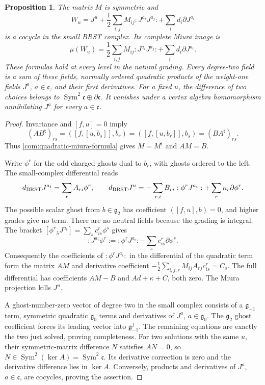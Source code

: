 \documentclass[11pt,a4paper]{amsart}
\numberwithin{equation}{section}
\newtheorem{proposition}[theorem]{Proposition}
\theoremstyle{definition}
\theoremstyle{remark}
\newcommand{\g}{\mathfrak g}
\newcommand{\Sym}{\operatorname{Sym}}
\begin{document}
\begin{proposition}\label{com:quadratic-miura}
The matrix $M$ is symmetric and
$$
 W_u=J^u+\frac12\sum_{i,j}M_{ij}:J^{a_i}J^{a_j}:
          +\sum_i d_i\partial J^{a_i}
$$
is a cocycle in the small BRST complex. Its complete Miura image is
$$
 \mu(W_u)=\frac12\sum_{i,j}M_{ij}:J^{a_i}J^{a_j}:
          +\sum_i d_i\partial J^{a_i}.
$$
These formulas hold at every level in the natural grading. Every
degree-two field is a sum of these fields, normally ordered quadratic
products of the weight-one fields $J^a$, $a\in\mathfrak c$, and their
first derivatives. For a fixed $u$, the difference of two choices belongs to $\Sym^2\mathfrak c\oplus\partial\mathfrak c$.
It vanishes under a vertex algebra homomorphism annihilating
$J^a$ for every $a\in\mathfrak c$.
\end{proposition}
\begin{proof}
Invariance and $[f,u]=0$ imply
$$
 (AB^{\mathsf t})_{rs}=([f,[u,b_s]],b_r)
 =([f,[u,b_r]],b_s)=(BA^{\mathsf t})_{rs}.
$$
Thus \eqref{com:quadratic-miura-formula} gives $M=M^{\mathsf t}$
and $AM=B$.

Write $\phi^r$ for the odd charged ghosts dual to $b_r$, with ghosts
ordered to the left. The small-complex differential
\cite[equation~(2.6)]{KacWakimoto2004} reads
$$
 d_{\rm BRST}J^{a_i}=\sum_r A_{ri}\phi^r,
 \qquad
 d_{\rm BRST}J^u=-\sum_{r,i}B_{ri}:\phi^rJ^{a_i}:
                         +\sum_r\kappa_r\partial\phi^r.
$$
The possible scalar ghost from $b\in\g_2$ has coefficient
$([f,u],b)=0$, and higher grades give no term. There are no neutral fields because the grading is integral. The bracket
$[\phi^r{}_{\lambda}J^{a_i}]=\sum_s c_{is}^{r}\phi^s$
gives
$$
 :J^{a_i}\phi^r:=:\phi^rJ^{a_i}:
                   -\sum_s c_{is}^{r}\partial\phi^s.
$$
Consequently the coefficients of $:\phi^rJ^{a_i}:$ in the
differential of the quadratic term form the matrix $AM$ and derivative coefficient
$-\frac12\sum_{i,j,r}M_{ij}A_{rj}c_{is}^{r}=C_s$.
The full differential has coefficients $AM-B$ and
$Ad+\kappa+C$, both zero. The Miura projection kills $J^u$.

A ghost-number-zero vector of degree two in the small complex consists
of a $\g_{-1}$ term, symmetric quadratic $\g_0$ terms and derivatives
of $J^a$, $a\in\g_0$. The $\g_2$ ghost coefficient forces its leading
vector into $\g_{-1}^f$. The remaining equations are exactly the two
just solved, proving completeness. For two solutions with the same
$u$, their symmetric-matrix difference $N$ satisfies $AN=0$, so
$N\in\Sym^2(\ker A)=\Sym^2\mathfrak c$. Its derivative correction
is zero and the derivative difference lies in $\ker A$.
Conversely, products and derivatives of $J^a$, $a\in\mathfrak c$,
are cocycles, proving the assertion.
\end{proof}
\end{document}
